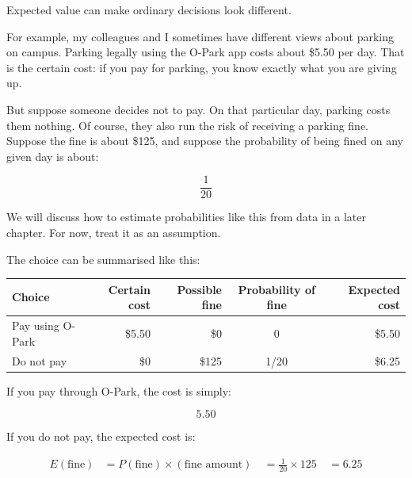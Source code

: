 \documentclass[
  letterpaper,
  DIV=11,
  numbers=noendperiod]{scrreprt}
\begin{document}
\begin{tcolorbox}[enhanced jigsaw, arc=.35mm, bottomrule=.15mm, bottomtitle=1mm, breakable, colback=white, colbacktitle=quarto-callout-note-color!10!white, colframe=quarto-callout-note-color-frame, coltitle=black, left=2mm, leftrule=.75mm, opacityback=0, opacitybacktitle=0.6, rightrule=.15mm, title=\textcolor{quarto-callout-note-color}{\faInfo}\hspace{0.5em}{Everyday expectation}, titlerule=0mm, toprule=.15mm, toptitle=1mm]

Expected value can make ordinary decisions look different.

For example, my colleagues and I sometimes have different views about
parking on campus. Parking legally using the O-Park app costs about
\$5.50 per day. That is the certain cost: if you pay for parking, you
know exactly what you are giving up.

But suppose someone decides not to pay. On that particular day, parking
costs them nothing. Of course, they also run the risk of receiving a
parking fine. Suppose the fine is about \$125, and suppose the
probability of being fined on any given day is about:

\[
\frac{1}{20}
\]

We will discuss how to estimate probabilities like this from data in a
later chapter. For now, treat it as an assumption.

The choice can be summarised like this:

\begin{table}
\fontsize{12.0pt}{14.0pt}\selectfont
\begin{tabular*}{\linewidth}{@{\extracolsep{\fill}}lrrcr}
\toprule
Choice & Certain cost & Possible fine & Probability of fine & Expected cost \\ 
\midrule\addlinespace[2.5pt]
Pay using O-Park & \$5.50 & \$0 & 0 & \$5.50 \\ 
Do not pay & \$0 & \$125 & 1/20 & \$6.25 \\ 
\bottomrule
\end{tabular*}
\end{table}

If you pay through O-Park, the cost is simply:

\[
5.50
\]

If you do not pay, the expected cost is:

\[
\begin{aligned}
E(\text{fine})
&=
P(\text{fine})\times(\text{fine amount}) \
&=
\frac{1}{20}\times 125 \
&=
6.25
\end{aligned}
\]


\end{tcolorbox}
\end{document}

